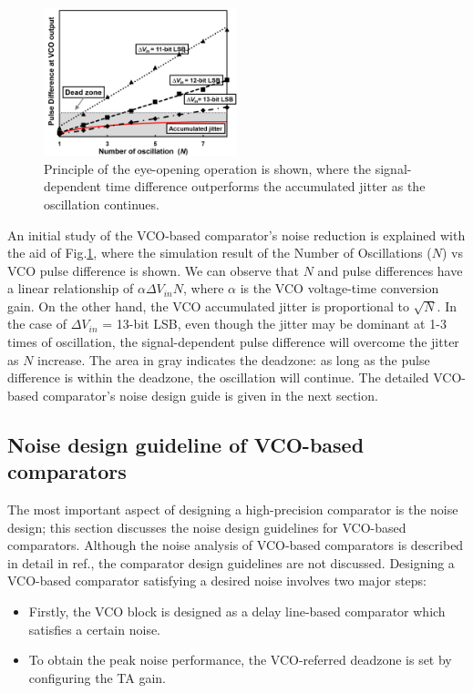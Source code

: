 \documentclass[journal]{IEEEtran}
\begin{document}
\begin{figure}[!]
\centering
 \includegraphics[width=0.5\textwidth]{figs/fig5.png}
  \caption{Principle of the eye-opening operation is shown, where the signal-dependent time difference outperforms the accumulated jitter as the oscillation continues.}
  \label{fig5}
\end{figure}

An initial study of the VCO-based comparator's noise reduction is explained with the aid of Fig.\ref{fig5}, where the simulation result of the Number of Oscillations ($N$) vs VCO pulse difference is shown. %
We can observe that $N$ and pulse differences have a linear relationship of $\alpha \Delta V_{in}N$, where $\alpha$ is the VCO voltage-time conversion gain. On the other hand, the VCO accumulated jitter is proportional to $\sqrt N$\cite{hajimiri1999jitter,abidi2006phase}. In the case of $\Delta V_{in}$ = 13-bit LSB, even though the jitter may be dominant at 1-3 times of oscillation, the signal-dependent pulse difference will overcome the jitter as $N$ increase. The area in gray indicates the deadzone: as long as the pulse difference is within the deadzone, the oscillation will continue. The detailed VCO-based comparator's noise design guide is given in the next section.

\subsection{Noise design guideline of VCO-based comparators}
The most important aspect of designing a high-precision comparator is the noise design; this section discusses the noise design guidelines for VCO-based comparators. Although the noise analysis of VCO-based comparators is described in detail in ref.\cite{luo2020input, ding20190}, the comparator design guidelines are not discussed. %
Designing a VCO-based comparator satisfying a desired noise involves two major steps:
\begin{itemize}
\item Firstly, the VCO block is designed as a delay line-based comparator which satisfies a certain noise. %
\item To obtain the peak noise performance, the VCO-referred deadzone is set by configuring the TA gain.
\end{itemize}
\end{document}
